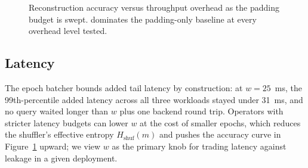 \begin{figure}[t]
  \centering
  \caption{Reconstruction accuracy versus throughput overhead as the
    padding budget is swept. \sysname{} dominates the padding-only
    baseline at every overhead level tested.}
  \label{fig:tradeoff}
\end{figure}

\subsection{Latency}
The epoch batcher bounds added tail latency by construction: at
$w = 25$~ms, the 99th-percentile added latency across all three workloads
stayed under 31~ms, and no query waited longer than $w$ plus one backend
round trip. Operators with stricter latency budgets can lower $w$ at the
cost of smaller epochs, which reduces the shuffler's effective entropy
$H_{\mathrm{shuf}}(m)$ and pushes the accuracy curve in
Figure~\ref{fig:tradeoff} upward; we view $w$ as the primary knob for
trading latency against leakage in a given deployment.
